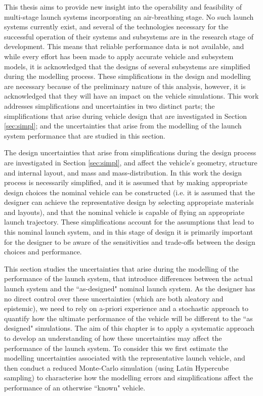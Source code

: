 This thesis aims to provide new insight into the operability and feasibility of multi-stage launch systems incorporating an air-breathing stage.
No such launch systems currently exist, and several of the technologies necessary for the successful operation of their systems and subsystems are in the research stage of development.
This means that reliable performance data is not available, and while every effort has been made to apply accurate vehicle and subsystem models, it is acknowledged that the designs of several subsystems are simplified during the modelling process. These simplifications in the design and modelling are necessary because of the preliminary nature of this analysis, however, it is acknowledged that they will have an impact on the vehicle simulations. 
This work addresses simplifications and uncertainties in two distinct parts; the simplifications that arise during vehicle design that are investigated in Section \ref{sec:simpl}; and the uncertainties that arise from the modelling of the launch system performance that are studied in this section. 

The design uncertainties that arise from simplifications during the design process are investigated in Section \ref{sec:simpl}, and affect the vehicle's geometry, structure and internal layout, and mass and mass-distribution. In this work the design process is necessarily simplified, and it is assumed that by making appropriate design choices the nominal vehicle can be constructed (i.e. it is assumed that the designer can achieve the representative design by selecting appropriate materials and layouts), and that the nominal vehicle is capable of flying an appropriate launch trajectory. These simplifications account for the assumptions that lead to this nominal launch system, and in this stage of design it is primarily important for the designer to be aware of the sensitivities and trade-offs between the design choices and performance. 

This section studies the uncertainties that arise during the modelling of the performance of the launch system, that introduce differences between the actual launch system and the ``as-designed" nominal launch system. 
As the designer has no direct control over these uncertainties (which are both aleatory and epistemic), we need to rely on a-priori experience and a stochastic approach to quantify how the ultimate performance of the vehicle will be different to the ``as designed" simulations. The aim of this chapter is to apply a systematic approach to develop an understanding of how these uncertainties may affect the performance of the launch system. To consider this we first estimate the modelling uncertainties associated with the representative launch vehicle, and then conduct a reduced Monte-Carlo simulation (using Latin Hypercube sampling) to characterise how the modelling errors and simplifications affect the performance of an otherwise ``known" vehicle.




